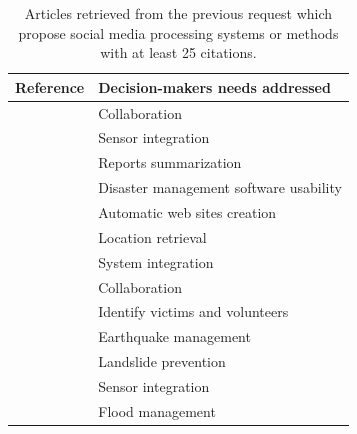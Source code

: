 \begin{table}[bht]
    \centering
    \tabulinesep=1.2mm
    \caption{Articles retrieved from the previous request which propose social media processing systems or methods with at least 25 citations.}
    \begin{tabu} to \textwidth {X[1,m]X[3,m]}
        Reference                                               & Decision-makers needs addressed        \\ [0.5ex]
        \toprule
        \cite{benabenMetamodelItsOntology2008}                  & Collaboration                          \\
        \cite{babitskiOntologybasedIntegrationSensor2009}       & Sensor integration                     \\
        \cite{liOntologyenrichedMultiDocumentSummarization2010} & Reports summarization                  \\
        \cite{babitskiSoKNOSUsingSemantic2011}                  & Disaster management software usability \\
        \cite{chouOntologyDevelopingWeb2011}                    & Automatic web sites creation           \\
        \cite{ghahremanlouGeotaggingTwitterMessages2014}        & Location retrieval                     \\
        \cite{madniSystemsIntegrationKey2014}                   & System integration                     \\
        \cite{othmanDevelopmentValidationDisaster2014}          & Collaboration                          \\
        \cite{purohitIdentifyingSeekersSuppliers2014}           & Identify victims and volunteers        \\
        \cite{xuModelingRepresentationEarthquake2014}           & Earthquake management                  \\
        \cite{jungOntologydrivenSlopeModeling2015}              & Landslide prevention                   \\
        \cite{posladSemanticIoTEarly2015}                       & Sensor integration                     \\
        \cite{qiuIntegratedFloodManagement2017}                 & Flood management                       \\
        \bottomrule
    \end{tabu}
    \label{table:situation-models-main-articles}
\end{table}

